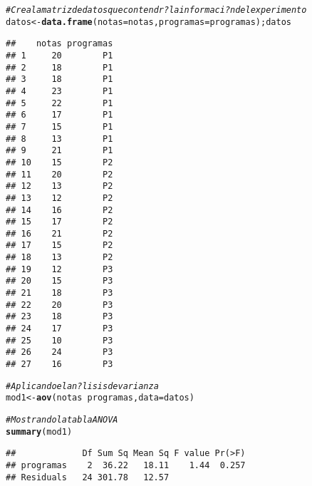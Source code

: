 \documentclass[10pt,a4paper]{article}\usepackage[]{graphicx}\usepackage[]{color}
\makeatletter
\newcommand{\hlcom}[1]{\textcolor[rgb]{0.678,0.584,0.686}{\textit{#1}}}%
\newcommand{\hlopt}[1]{\textcolor[rgb]{0,0,0}{#1}}%
\newcommand{\hlstd}[1]{\textcolor[rgb]{0.345,0.345,0.345}{#1}}%
\newcommand{\hlkwb}[1]{\textcolor[rgb]{0.69,0.353,0.396}{#1}}%
\newcommand{\hlkwc}[1]{\textcolor[rgb]{0.333,0.667,0.333}{#1}}%
\newcommand{\hlkwd}[1]{\textcolor[rgb]{0.737,0.353,0.396}{\textbf{#1}}}%
\newenvironment{kframe}{%
 \def\at@end@of@kframe{}%
 \ifinner\ifhmode%
  \def\at@end@of@kframe{\end{minipage}}%
  \begin{minipage}{\columnwidth}%
 \fi\fi%
 \def\FrameCommand##1{\hskip\@totalleftmargin \hskip-\fboxsep
 \colorbox{shadecolor}{##1}\hskip-\fboxsep
     \hskip-\linewidth \hskip-\@totalleftmargin \hskip\columnwidth}%
 \MakeFramed {\advance\hsize-\width
   \@totalleftmargin\z@ \linewidth\hsize
   \@setminipage}}%
 {\par\unskip\endMakeFramed%
 \at@end@of@kframe}
\newenvironment{knitrout}{}{} %
\makeatother
\begin{document}
\begin{knitrout}
\begin{kframe}
\begin{alltt}
\hlcom{#Crea la matriz de datos que contendr? la informaci?n del experimento}
\hlstd{datos} \hlkwb{<-} \hlkwd{data.frame}\hlstd{(}\hlkwc{notas} \hlstd{= notas,} \hlkwc{programas} \hlstd{= programas);datos}
\end{alltt}
\begin{verbatim}
##    notas programas
## 1     20        P1
## 2     18        P1
## 3     18        P1
## 4     23        P1
## 5     22        P1
## 6     17        P1
## 7     15        P1
## 8     13        P1
## 9     21        P1
## 10    15        P2
## 11    20        P2
## 12    13        P2
## 13    12        P2
## 14    16        P2
## 15    17        P2
## 16    21        P2
## 17    15        P2
## 18    13        P2
## 19    12        P3
## 20    15        P3
## 21    18        P3
## 22    20        P3
## 23    18        P3
## 24    17        P3
## 25    10        P3
## 26    24        P3
## 27    16        P3
\end{verbatim}
\begin{alltt}
\hlcom{#Aplicando el an?lisis de varianza }
\hlstd{mod1} \hlkwb{<-} \hlkwd{aov}\hlstd{(notas} \hlopt{~} \hlstd{programas,} \hlkwc{data} \hlstd{= datos)}

\hlcom{#Mostrando la tabla ANOVA }
\hlkwd{summary}\hlstd{(mod1)}
\end{alltt}
\begin{verbatim}
##             Df Sum Sq Mean Sq F value Pr(>F)
## programas    2  36.22   18.11    1.44  0.257
## Residuals   24 301.78   12.57
\end{verbatim}
\end{kframe}
\end{knitrout}
\end{document}
